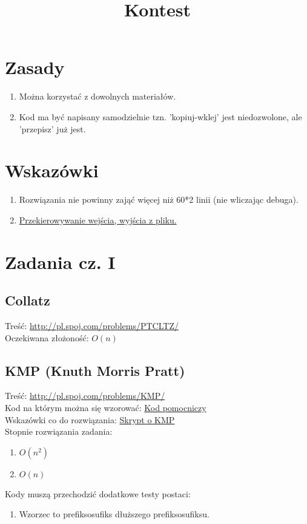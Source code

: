 \documentclass{article}
\theoremstyle{break}
\begin{document}
\title{Kontest}

\maketitle

\section{Zasady}
\begin{enumerate}
\item Można korzystać z dowolnych materiałów.
\item Kod ma być napisany samodzielnie tzn. 'kopiuj-wklej' jest niedozwolone, ale 'przepisz' już jest.
\end{enumerate}
\section{Wskazówki}
\begin{enumerate}
\item Rozwiązania nie powinny zająć więcej niż 60*2 linii (nie wliczając debuga).
\item \href{https://www.oi.edu.pl/old/php/show.php?ac=p173000&module=show&file=oi18/przekierowanie}{Przekierowywanie wejścia, wyjścia z pliku.}
\end{enumerate}

\section{Zadania cz. I}

\subsection{Collatz}
Treść: \url{http://pl.spoj.com/problems/PTCLTZ/} \\
Oczekiwana złożoność: $O(n)$

\subsection{KMP (Knuth Morris Pratt)}
Treść: \url{http://pl.spoj.com/problems/KMP/} \\
Kod na którym można się wzorować: \href{https://gist.github.com/gongzhitaao/5e9d8f80aaba60e14a2c}{Kod pomocniczy} \\
Wskazówki co do rozwiązania: \href{http://students.mimuw.edu.pl/~bw386389/13-str/str.pdf}{Skrypt o KMP} \\
Stopnie rozwiązania zadania:
\begin{enumerate}
\item $O(n^2)$
\item $O(n)$
\end{enumerate}
Kody muszą przechodzić dodatkowe testy postaci:
\begin{enumerate}
\item Wzorzec to prefiksosufiks dłuższego prefiksosufiksu.
\end{enumerate}
\end{document}

